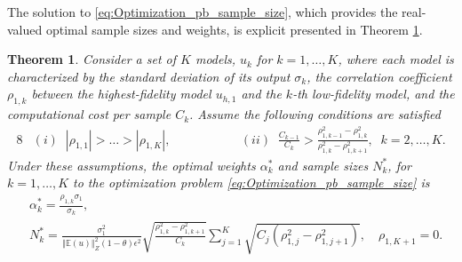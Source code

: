 \documentclass[final,3p,times,11pt]{elsarticle}
\newtheorem{theorem}{Theorem}%
\begin{document}
%
The solution to \eqref{eq:Optimization_pb_sample_size}, which provides the real-valued optimal sample sizes and weights, is explicit presented in Theorem \ref{thm:Sample_size_est}. 
%
\begin{theorem}
\label{thm:Sample_size_est}
Consider a set of $K$ models, $u_k$ for $k=1,\ldots,K$, where each model is characterized by the standard deviation of its output $\sigma_k$, the correlation coefficient $\rho_{1,k}$ between the highest-fidelity model $u_{h,1}$ and the $k$-th low-fidelity model, and the computational cost per sample $C_k$. Assume the following conditions are satisfied
%
\begin{alignat*}{8}
    &(i)\;\; |\rho_{1,1}|>\ldots>|\rho_{1,K}|,& \qquad \qquad
    &(ii)\;\; \frac{C_{k-1}}{C_k}>\frac{\rho_{1,k-1}^2-\rho_{1,k}^2}{\rho_{1,k}^2-\rho_{1,k+1}^2},\;\;k=2,\ldots,K.
\end{alignat*}
%
Under these assumptions, the optimal weights $\alpha_k^*$ and sample sizes $N_k^*$, for $k=1,\ldots, K$ to the optimization problem \eqref{eq:Optimization_pb_sample_size} is
%
\begin{align}
    \label{eq:MFMC_coefficients}
    &\alpha_k^*=\frac{\rho_{1,k}\sigma_1}{\sigma_k},\\
    \label{eq:MFMC_SampleSize}
    &N_k^*=\frac{\sigma_1^2}{\left\Vert\mathbb{E}(u) \right\Vert_{Z}^2(1-\theta)\epsilon^2}\sqrt{\frac{\rho_{1,k}^2-\rho_{1,k+1}^2}{C_k}}\sum_{j=1}^K\sqrt{C_j\left(\rho_{1,j}^2-\rho_{1,j+1}^2\right)}, \quad \rho_{1,K+1}=0.
\end{align}
%
\end{theorem}
%
\end{document}
